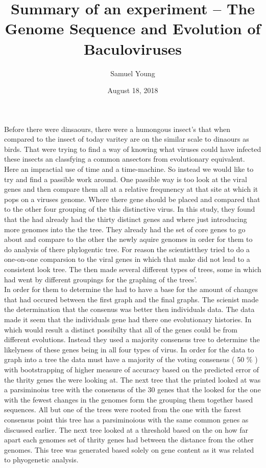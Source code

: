 \documentclass{article}[12pt,a4paper,twoside,draft]
\author{Samuel Young}
\date{August 18, 2018}
\title{Summary of an experiment -- The Genome Sequence and Evolution of Baculoviruses}
\begin{document}
\maketitle

   Before there were dinsaours, there were a humongous insect's that when compared to the insect of today varitey are on the similar scale to dinaours as birds.
   That were trying to find a way of knowing what viruses could have infected these insects an classfying a common ansectors from evolutionary equivalent.
   Here an impractial use of time and a time-machine.
   So instead we would like to try and find a passible work around. 
   One passible way is too look at the viral genes and then compare them all at a relative frequnency at that site at which it pops on a viruses genome.
   Where there gene should be placed and compared that to the other four grouping of the this distinctive virus.
   In this study, they found that the had already had the thirty distinct genes and where just introducing more genomes into the the tree.
   They already had the set of core genes to go about and compare to the other the newly aquire genomes in order for them to do analysis of there phylogentic tree. 
   For reason the scientistthey tried to do a one-on-one comparsion to the viral genes in which that make did not lead to a consistent look tree.
   The then  made several different types of trees, some in which had went by different groupings for the graphing of the trees'. \\
   In order for them to determine the had to have a base for the amount of changes that had occured between the first graph and the final graphs.
   The scienist made the determination that the consenus was better then individuals data.
   The data made it seem that the individuals gene had there one evolutionary histories. 
   In which would result a distinct possibilty that all of the genes could be from different evolutions.
   Instead they used a majority consensus tree to determine the likelyness of these genes being in all four types of virus.
  In order for the data to graph into a tree the data must have a majority of the voting consensus  ( 50 \% ) with bootstrapping of higher measure of accuracy based on the predicted error of the thrity genes the were looking at.  
  The next tree that the printed looked at was a parsiminoius tree with the consensus of the 30 genes that the looked for the one with the fewest changes in the genomes form the grouping them together based sequences.
  All but one of the trees were rooted from the one with the farest consensus point this tree has a parsiminoious with the same common genes as discussed earlier. 
  The next tree looked at a threshold based on the on how far apart each genomes set of thrity genes had between the  distance from the other genomes.
   This tree was generated based solely on gene content as it was related to phyogenetic analysis.
   \\
\end{document}
